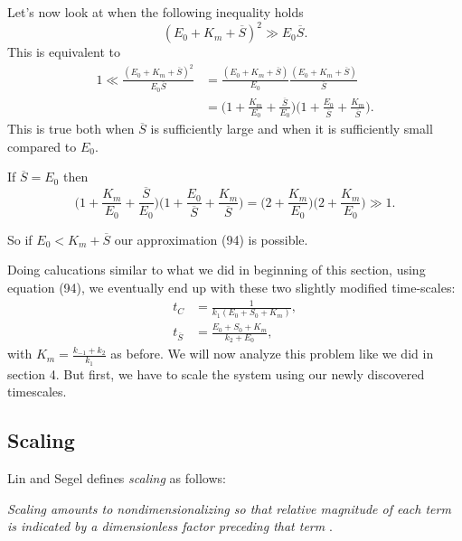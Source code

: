 \documentclass[12pt]{article}
\begin{document}
Let's now look at when the following inequality holds
\begin{equation}
(E_0 + K_m + \overline{S})^2 \gg E_0 \overline{S}.
\end{equation}
This is equivalent to
\begin{align}
1 \ll
  \frac{(E_0 + K_m + \overline{S})^2}
           {E_0 \overline{S}} &= 
\frac{(E_0 + K_m + \overline{S})}
      {E_0} \frac{(E_0 + K_m + \overline{S})}{\overline{S}} \\
&= \Big(1 + \frac{K_m}{E_0} + \frac{\overline{S}}{E_0}\Big)
   \Big(1 + \frac{E_0}{\overline{S}} + \frac{K_m}{\overline{S}}\Big).
\end{align}
This is true both when $\overline{S}$ is sufficiently large and when
it is sufficiently small compared to $E_0$.

If $\overline{S} = E_0$ then
\begin{equation}
\Big(1 + \frac{K_m}{E_0} + \frac{\overline{S}}{E_0}\Big)\Big(1 + \frac{E_0}{\overline{S}} + \frac{K_m}{\overline{S}}\Big) = \Big(2 + \frac{K_m}{E_0}\Big) \Big(2 + \frac{K_m}{E_0}\Big) \gg 1.
\end{equation}

So if $E_0 < K_m + \overline{S}$ our approximation (94) is possible.

Doing calucations similar to what we did in beginning of this section,
using equation (94), we eventually end up with these two slightly
modified time-scales:
\begin{align}
t_C &= \frac{1}{k_1(E_0+S_0+K_m)}, \\
t_{\overline{S}} &= \frac{E_0+S_0+K_m}{k_2+E_0},
\end{align}
with $K_m = \frac{k_{-1}+k_2}{k_1}$ as before. We will now analyze
this problem like we did in section 4. But first, we have to
scale the system using our newly discovered timescales.

\subsection{Scaling}

Lin and Segel defines \textit{scaling} as follows:

\textit{Scaling amounts to nondimensionalizing so that relative magnitude of
each term is indicated by a dimensionless factor preceding that term}
\cite{lin1974mathematics}.
\end{document}

